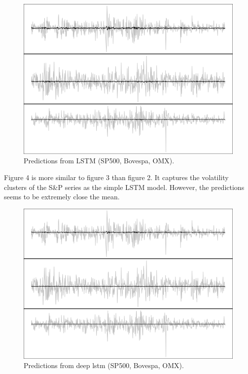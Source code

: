 \documentclass[12pt, letterpaper]{amsart}%
\begin{document}
\begin{figure}[H]
\caption{Predictions from LSTM (SP500, Bovespa, OMX).}
\centering
\includegraphics[scale=0.5]{lstm_pred.png}
\end{figure}

Figure 4 is more similar to figure 3 than figure 2. It captures the volatility clusters of the S\&P series as the simple LSTM model. However, the predictions seems to be extremely close the mean.
\\

\begin{figure}[H]
\caption{Predictions from deep lstm (SP500, Bovespa, OMX).}
\centering
\includegraphics[scale=0.5]{lstm_deep_pred.png}
\end{figure}
\end{document}
